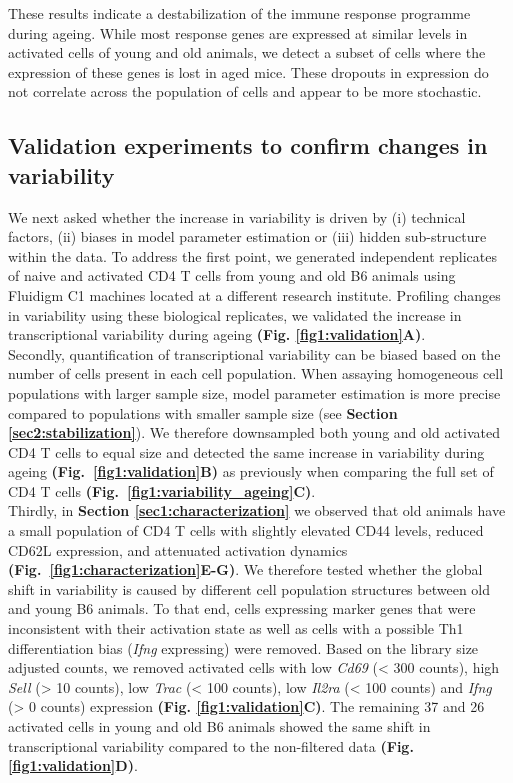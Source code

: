 \newpage

These results indicate a destabilization of the immune response programme during ageing. While most response genes are expressed at similar levels in activated cells of young and old animals, we detect a subset of cells where the expression of these genes is lost in aged mice. These dropouts in expression do not correlate across the population of cells and appear to be more stochastic. 

\subsection{Validation experiments to confirm changes in variability}

We next asked whether the increase in variability is driven by (i) technical factors, (ii) biases in model parameter estimation or (iii) hidden sub-structure within the data. To address the first point, we generated independent replicates of naive and activated CD4\plus{} T cells from young and old B6 animals using Fluidigm C1 machines located at a different research institute. Profiling changes in variability using these biological replicates, we validated the increase in transcriptional variability during ageing \textbf{(Fig. \ref{fig1:validation}A)}.\\

Secondly, quantification of transcriptional variability can be biased based on the number of cells present in each cell population. When assaying homogeneous cell populations with larger sample size, model parameter estimation is more precise compared to populations with smaller sample size (see \textbf{Section \ref{sec2:stabilization}}). We therefore downsampled both young and old activated CD4\plus{} T cells to equal size and detected the same increase in variability during ageing \textbf{(Fig.~\ref{fig1:validation}B)} as previously when comparing the full set of CD4\plus{} T cells \textbf{(Fig.~\ref{fig1:variability_ageing}C)}. \\

Thirdly, in \textbf{Section \ref{sec1:characterization}} we observed that old animals have a small population of CD4\plus{} T cells with slightly elevated CD44 levels, reduced CD62L expression, and attenuated activation dynamics \textbf{(Fig.~\ref{fig1:characterization}E-G)}. We therefore tested whether the global shift in variability is caused by different cell population structures between old and young B6 animals. To that end, cells expressing marker genes that were inconsistent with their activation state as well as cells with a possible Th1 differentiation bias (\textit{Ifng} expressing) were removed. Based on the library size adjusted counts, we removed activated cells with low \textit{Cd69} (< 300 counts), high \textit{Sell} (> 10 counts), low \textit{Trac} (< 100 counts), low \textit{Il2ra} (< 100 counts) and \textit{Ifng} (> 0 counts) expression \textbf{(Fig. \ref{fig1:validation}C)}. The remaining 37 and 26 activated cells in young and old B6 animals showed the same shift in transcriptional variability compared to the non-filtered data \textbf{(Fig. \ref{fig1:validation}D)}. 

